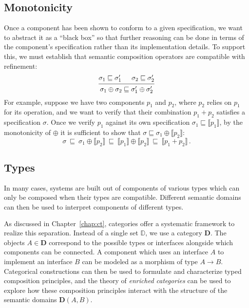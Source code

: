 \documentclass[11pt,oneside,draft]{book}
\theoremstyle{definition}
\newcommand{\refby}{\sqsubseteq} %
\begin{document}

\subsection{Monotonicity} %

Once a component has been shown to conform to a given specification,
we want to abstract it as a ``black box''
so that further reasoning can be done in terms of
the component's specification rather than its implementation details.
To support this,
we must establish that semantic composition operators
are compatible with refinement:
\[
  \begin{prooftree}
    \hypo{\sigma_1 \refby \sigma_1'}
    \hypo{\sigma_2 \refby \sigma_2'}
    \infer2{\sigma_1 \oplus \sigma_2 \refby \sigma_1' \oplus \sigma_2'}
  \end{prooftree}
\]
For example,
suppose we have two components $p_1$ and $p_2$,
where $p_2$ relies on $p_1$ for its operation,
and we want to verify that their combination $p_1 + p_2$
satisfies a specification $\sigma$.
Once we verify $p_1$ against its own specification
$\sigma_1 \refby \llbracket p_1 \rrbracket$,
by the monotonicity of ${\oplus}$ it is sufficient to show that
$\sigma \refby \sigma_1 \oplus \llbracket p_2 \rrbracket$:
\[
   \sigma \:\refby\:
   \sigma_1 \oplus \llbracket p_2 \rrbracket \:\refby\:
   \llbracket p_1 \rrbracket \oplus \llbracket p_2 \rrbracket \:\refby\:
   \llbracket p_1 + p_2 \rrbracket \,.
\]


\subsection{Types} %

In many cases,
systems are built out of components of various types
which can only be composed when their types are compatible.
Different semantic domains can then be used
to interpret components of different types.

As discussed in Chapter~\ref{chap:ct},
categories offer a systematic framework
to realize this separation.
Instead of a single set $\mathbb{D}$,
we use a category $\mathbf{D}$.
The objects $A \in \mathbf{D}$ correspond to
the possible types or interfaces alongside which
components can be connected.
A component which
uses an interface $A$ to
implement an interface $B$
can be modeled as a morphism
of type $A \rightarrow B$.
Categorical constructions can then be used
to formulate and characterize typed composition principles,
and the theory of \emph{enriched categories}
can be used to explore how these composition principles
interact with the structure of the semantic domains
$\mathbf{D}(A, B)$.
\end{document}

